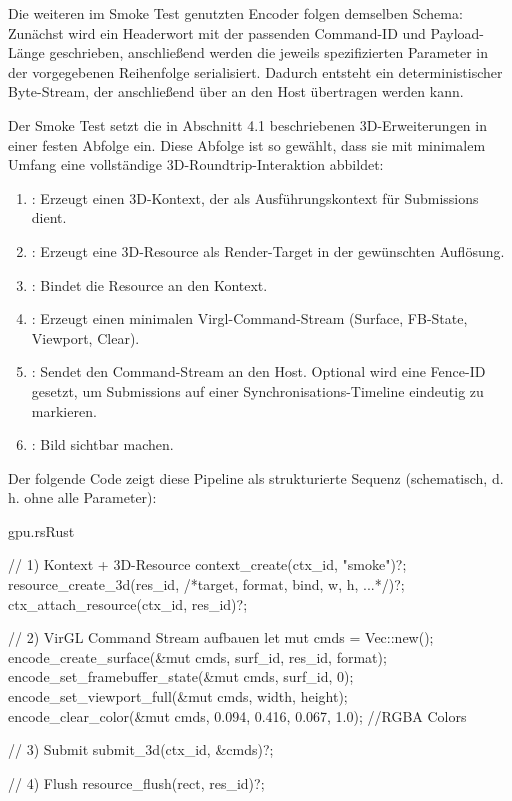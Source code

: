 Die weiteren im Smoke Test genutzten Encoder folgen demselben Schema: Zunächst wird ein Headerwort mit der passenden Command-ID und Payload-Länge geschrieben, anschließend werden die jeweils spezifizierten Parameter in der vorgegebenen Reihenfolge serialisiert. Dadurch entsteht ein deterministischer Byte-Stream, der anschließend über  an den Host übertragen werden kann.

Der Smoke Test setzt die in Abschnitt 4.1 beschriebenen 3D-Erweiterungen in einer festen Abfolge ein. Diese Abfolge ist so gewählt, dass sie mit minimalem Umfang eine vollständige 3D-Roundtrip-Interaktion abbildet:

\begin{enumerate}
    \item {}: Erzeugt einen 3D-Kontext, der als Ausführungskontext für Submissions dient.
    \item {}: Erzeugt eine 3D-Resource als Render-Target in der gewünschten Auflösung.
    \item {}: Bindet die Resource an den Kontext.
    \item {}: Erzeugt einen minimalen Virgl-Command-Stream (Surface, FB-State, Viewport, Clear).
    \item {}: Sendet den Command-Stream an den Host. Optional wird eine Fence-ID gesetzt, um Submissions auf einer Synchronisations-Timeline eindeutig zu markieren.
    \item {}: Bild sichtbar machen.
\end{enumerate}

Der folgende Code zeigt diese Pipeline als strukturierte Sequenz (schematisch, d. h. ohne alle Parameter):

\begin{codeblock}{gpu.rs}{Rust}
  \begin{rustcode}
// 1) Kontext + 3D-Resource
context_create(ctx_id, "smoke")?;
resource_create_3d(res_id, /*target, format, bind, w, h, ...*/)?;
ctx_attach_resource(ctx_id, res_id)?;

// 2) VirGL Command Stream aufbauen
let mut cmds = Vec::new();
encode_create_surface(&mut cmds, surf_id, res_id, format);
encode_set_framebuffer_state(&mut cmds, surf_id, 0);
encode_set_viewport_full(&mut cmds, width, height);
encode_clear_color(&mut cmds, 0.094, 0.416, 0.067, 1.0); //RGBA Colors

// 3) Submit
submit_3d(ctx_id, &cmds)?;

// 4) Flush
resource_flush(rect, res_id)?;
  \end{rustcode}
\end{codeblock}

